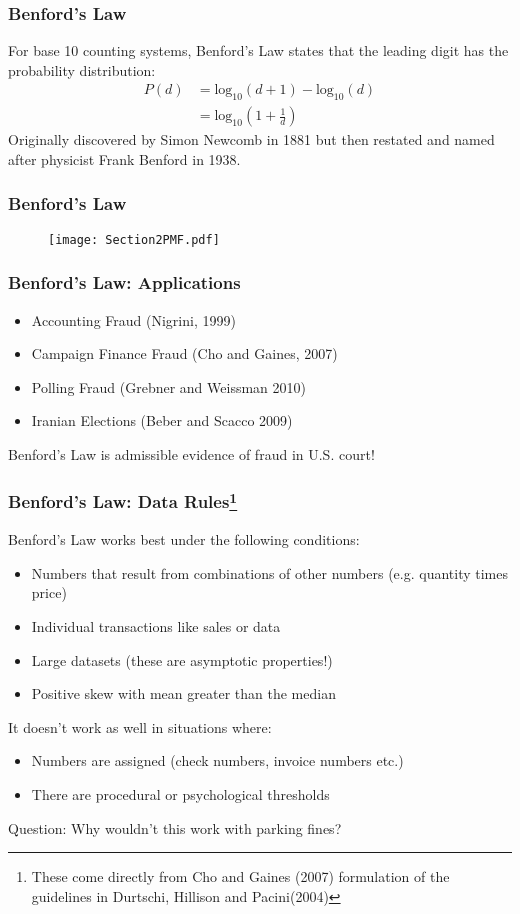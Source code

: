 \documentclass{beamer}
\begin{document}
\begin{frame}\frametitle{Benford's Law}
For base 10 counting systems, Benford's Law states that the leading digit has the probability distribution:
\begin{align*}
P(d) &= \text{log}_{10}(d + 1) - \text{log}_{10}(d) \\
&= \text{log}_{10}(1 + \frac{1}{d})
\end{align*}
Originally discovered by Simon Newcomb in 1881 but then restated and named after physicist Frank Benford in 1938.
\end{frame}

\begin{frame}\frametitle{Benford's Law}
\begin{figure}[h!]
\centering
\texttt{[image: Section2PMF.pdf]}
\end{figure}
\end{frame}

\begin{frame}\frametitle{Benford's Law: Applications}
\begin{itemize}
\item Accounting Fraud (Nigrini, 1999)
\item Campaign Finance Fraud (Cho and Gaines, 2007)
\item Polling Fraud (Grebner and Weissman 2010)
\item Iranian Elections (Beber and Scacco 2009)
\end{itemize}
Benford's Law is admissible evidence of fraud in U.S. court!
\end{frame}

\begin{frame}\frametitle{Benford's Law: Data Rules\footnote{These come directly from Cho and Gaines (2007) formulation of the guidelines in Durtschi, Hillison and Pacini(2004)}}
Benford's Law works best under the following conditions:
\begin{itemize}
\item Numbers that result from combinations of other numbers (e.g. quantity times price)
\item Individual transactions like sales or data
\item Large datasets (these are asymptotic properties!)
\item Positive skew with mean greater than the median
\end{itemize}
It doesn't work as well in situations where:
\begin{itemize}
\item Numbers are assigned (check numbers, invoice numbers etc.)
\item There are procedural or psychological thresholds
\end{itemize}
Question: Why wouldn't this work with parking fines?
\end{frame}
\end{document}
